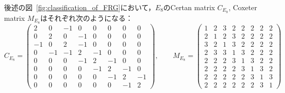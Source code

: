 \begin{example}
  後述の図~\ref{fig:classification_of_FRG}において，$E_8$のCertan matrix $C_{E_8}$, Coxeter matrix $M_{E_8}$はそれぞれ次のようになる：
  \begin{equation}
    C_{E_8} =
    \begin{pmatrix}
      2 & 0 & -1 & 0 & 0 & 0 & 0 & 0 \\
      0 & 2 & 0 & -1 & 0 & 0 & 0 & 0 \\
      -1 & 0 & 2 & -1 & 0 & 0 & 0 & 0 \\
      0 & -1 & -1 & 2 & -1 & 0 & 0 & 0 \\
      0 & 0 & 0 & -1 & 2 & -1 & 0 & 0 \\
      0 & 0 & 0 & 0 & -1 & 2 & -1 & 0 \\
      0 & 0 & 0 & 0 & 0 & -1 & 2 & -1 \\
      0 & 0 & 0 & 0 & 0 & 0 & -1 & 2
    \end{pmatrix},\qquad
    M_{E_8} =
    \begin{pmatrix}
      1 & 2 & 3 & 2 & 2 & 2 & 2 & 2 \\
      2 & 1 & 2 & 3 & 2 & 2 & 2 & 2 \\
      3 & 2 & 1 & 3 & 2 & 2 & 2 & 2 \\
      2 & 3 & 3 & 1 & 3 & 2 & 2 & 2 \\
      2 & 2 & 2 & 3 & 1 & 3 & 2 & 2 \\
      2 & 2 & 2 & 2 & 3 & 1 & 3 & 2 \\
      2 & 2 & 2 & 2 & 2 & 3 & 1 & 3 \\
      2 & 2 & 2 & 2 & 2 & 2 & 3 & 1
    \end{pmatrix}
  \end{equation}
\end{example}

